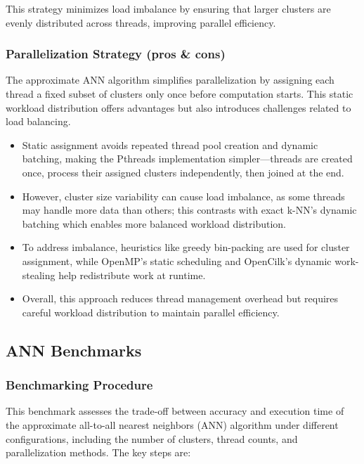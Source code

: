 \documentclass{article}
\begin{document}
This strategy minimizes load imbalance by ensuring that larger clusters are evenly distributed across threads,
improving parallel efficiency.

\subsubsection{Parallelization Strategy (pros \& cons)}

The approximate ANN algorithm simplifies parallelization by assigning each thread a fixed subset of clusters 
only once before computation starts. This static workload distribution offers advantages but also introduces 
challenges related to load balancing.

\begin{itemize}
    \item Static assignment avoids repeated thread pool creation and dynamic batching, making the Pthreads 
    implementation simpler—threads are created once, process their assigned clusters independently, then 
    joined at the end.
    \item However, cluster size variability can cause load imbalance, as some threads may handle more data than 
    others; this contrasts with exact k-NN’s dynamic batching which enables more balanced workload distribution.
    \item To address imbalance, heuristics like greedy bin-packing are used for cluster assignment, while OpenMP's
    static scheduling and OpenCilk’s dynamic work-stealing help redistribute work at runtime.
    \item Overall, this approach reduces thread management overhead but requires careful workload distribution 
    to maintain parallel efficiency.
\end{itemize}

\subsection{ANN Benchmarks}

\subsubsection{Benchmarking Procedure}

This benchmark assesses the trade-off between accuracy and execution time of the approximate all-to-all 
nearest neighbors (ANN) algorithm under different configurations, including the number of clusters, 
thread counts, and parallelization methods. The key steps are:
\end{document}
